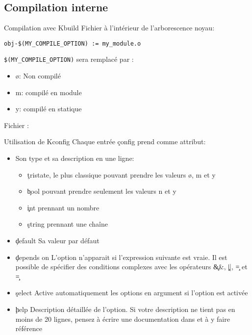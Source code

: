 \subsection{Compilation interne}

\begin{frame}[fragile=singleslide]{Compilation avec Kbuild}
  Fichier  à l'intérieur de l'arborescence noyau:
  \begin{lstlisting}
obj-$(MY_COMPILE_OPTION) := my_module.o
  \end{lstlisting} %
  \lstinline+$(MY_COMPILE_OPTION)+ sera remplacé par :
  \begin{itemize}
  \item ø: Non compilé
  \item m: compilé en module
  \item y: compilé en statique
  \end{itemize}
  Fichier :
  
\end{frame}

\begin{frame}[fragile=singleslide]{Utilisation de Kconfig}
  Chaque entrée \c{config} prend comme attribut:
  \begin{itemize}
  \item Son type et sa description en une ligne:
    \begin{itemize}
    \item \c{tristate}, le plus  classique pouvant prendre les valeurs
     ø, m et y
    \item \c{bool} pouvant prendre seulement les valeurs n et y
    \item \c{int} prennant un nombre
    \item \c{string} prennant une chaîne
    \end{itemize}
  \item \c{default} Sa valeur par défaut
  \item  \c{depends on} L'option  n'apparait si  l'expression suivante
    est vraie.  Il est possible de spécifier  des conditions complexes
    avec les opérateurs \c{&&}, \c{||}, \c{=} et \c{\!=}
  \item \c{select}  Active automatiquement les options  en argument si
    l'option est activée
  \item   \c{help}  Description   détaillée  de   l'option.   Si  votre
    description ne  tient pas en moins  de 20 lignes,  pensez à écrire
    une documentation dans  et à y faire référence
  \end{itemize}
\end{frame}

